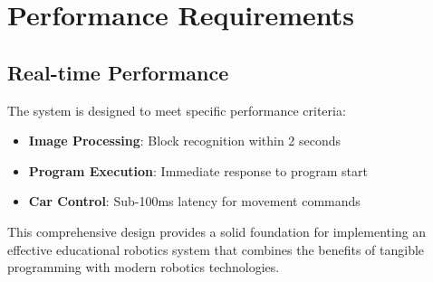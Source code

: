 \section{Performance Requirements}

\subsection{Real-time Performance}

The system is designed to meet specific performance criteria:

\begin{itemize}
    \item \textbf{Image Processing}: Block recognition within 2 seconds
    \item \textbf{Program Execution}: Immediate response to program start
    \item \textbf{Car Control}: Sub-100ms latency for movement commands
\end{itemize}



This comprehensive design provides a solid foundation for implementing an effective educational robotics system that combines the benefits of tangible programming with modern robotics technologies.